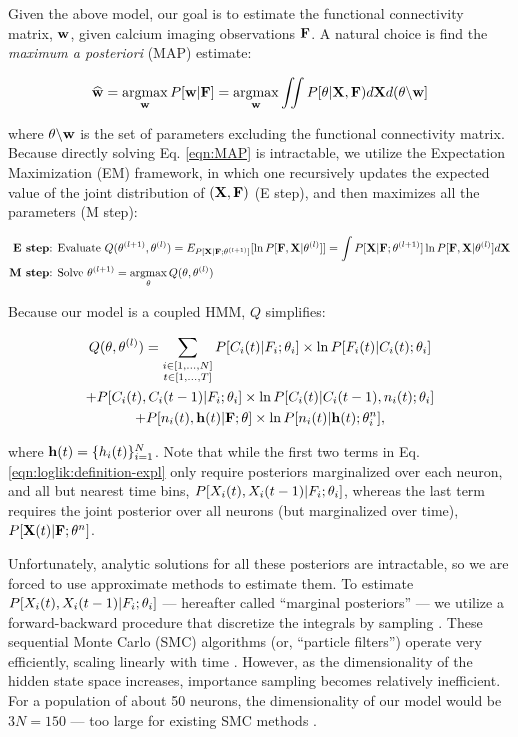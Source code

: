 Given the above model, our goal is to estimate the functional connectivity matrix, $\mathbf{w}$, given calcium imaging observations ${\bf F}$. A natural choice is find the \emph{maximum a posteriori} (MAP) estimate:

\begin{equation}\label{eqn:MAP}
\widehat{\mathbf{w}}=\operatorname*{argmax}_{\mathbf{w}} P[\mathbf{w}| {\bf F}] = \operatorname*{argmax}_{\mathbf{w}} \iint P[\mathbf{\theta}| {\bf X}, {\bf F}) d{\bf X} d(\mathbf{\theta} \backslash \mathbf{w}]
\end{equation}

\noindent where $\mathbf{\theta} \backslash \mathbf{w}$ is the set of parameters excluding the functional connectivity matrix.  Because directly solving Eq. \eqref{eqn:MAP} is intractable, we utilize the Expectation Maximization (EM) framework, in which one recursively updates the expected value of the joint distribution of $({\bf X}, {\bf F})$ (E step), and then maximizes all the parameters (M step):

\begin{align*}
\textbf{E step} &\text{: Evaluate } Q(\mathbf{\theta}^{(l+1)},\mathbf{\theta}^{(l)}) = E_{P[{\bf X} | {\bf F}; \mathbf{\theta}^{(l+1)}]}[ \ln P[{\bf F}, {\bf X} | \mathbf{\theta}^{(l)}]] = \int P[{\bf X} | {\bf F}; \mathbf{\theta}^{(l+1)}] \ln P[{\bf F}, {\bf X} | \mathbf{\theta}^{(l)}] d {\bf X}  \\
\textbf{M step} &\text{: Solve } \mathbf{\theta}^{(l+1)} = \operatorname*{argmax}_{\mathbf{\theta}} Q(\mathbf{\theta},\mathbf{\theta}^{(l)})  
\end{align*}

Because our model is a coupled HMM, $Q$ simplifies:

\begin{multline}\label{eqn:loglik:definition-expl}
Q(\mathbf{\theta},\mathbf{\theta}^{(l)}) = 
\sum_{\substack{i \in [1,\ldots,N] \\ t \in [1,\ldots, T]}} 
P[C_i(t) | F_i; \mathbf{\theta}_i] \times \ln P[F_i(t)|C_i(t); \mathbf{\theta}_i] 
\\ + P[C_i(t), C_i(t-1) | F_i; \mathbf{\theta}_i] \times \ln P[C_i(t)|C_i(t-1), n_i(t); \mathbf{\theta}_i] 
\\ + P[n_i(t), \mathbf{h}(t) | {\bf F}; \mathbf{\theta}] \times \ln P[n_i(t)| \mathbf{h}(t); \mathbf{\theta}^n_i],
\end{multline}

\noindent where $\mathbf{h}(t)=\{h_i(t)\}_{i=1}^N$.  Note that while the first two terms in Eq. \eqref{eqn:loglik:definition-expl} only require posteriors marginalized over each neuron, and all but nearest time bins, $P[X_i(t), X_i(t-1) | F_i; \mathbf{\theta}_i]$, whereas the last term requires the joint posterior over all neurons (but marginalized over time), $P[{\bf X}(t) | {\bf F}; \mathbf{\theta}^n]$.  

Unfortunately, analytic solutions for all these posteriors are intractable, so we are forced to use approximate methods to estimate them.  To estimate $P[X_i(t), X_i(t-1) | F_i; \mathbf{\theta}_i]$ --- hereafter called ``marginal posteriors'' ---  we utilize a forward-backward procedure that discretize the integrals by sampling \cite{DFG01, MINKAPHD, Fearnhead2003, koyama08, Andrieu2007, NBR03}.  These sequential Monte Carlo (SMC) algorithms (or, ``particle filters'') operate very efficiently, scaling linearly with time \cite{RAB89}. However, as the dimensionality of the hidden state space increases, importance sampling becomes relatively inefficient.  For a population of about 50 neurons, the dimensionality of our model would be $3N=150$ --- too large for existing SMC methods \cite{??}.  

